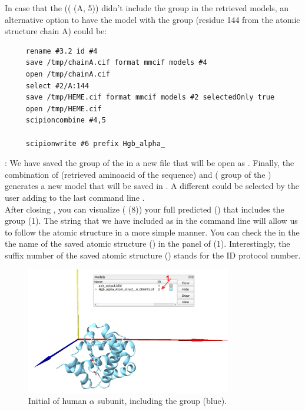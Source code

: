 In case that the   (( (A, 5)) didn't include the  group in the retrieved models, an alternative option to have the model with the  group (residue 144 from the atomic structure  chain A) could be:
\begin{verbatim}
     rename #3.2 id #4
     save /tmp/chainA.cif format mmcif models #4
     open /tmp/chainA.cif
     select #2/A:144
     save /tmp/HEME.cif format mmcif models #2 selectedOnly true 
     open /tmp/HEME.cif
     scipioncombine #4,5

     scipionwrite #6 prefix Hgb_alpha_
 \end{verbatim}
 : We have saved the  group of the   in a new file that will be open as  . Finally, the combination of   (retrieved aminoacid  of the  sequence) and  ( group of the  ) generates a new model  that will be saved in \scipion. A different  could be selected by the user adding to the last command line .\\


After closing \chimera, you can visualize ( (8)) your full predicted  () that includes the  group (1).  The string that we have included as  in the command line  will allow us to follow the atomic structure in a more simple manner. You can check the  in the the name of the saved atomic structure () in the  panel of  (1). Interestingly, the suffix number of the saved atomic structure () stands for the ID protocol number.
 
 \begin{figure}[H]
  \centering 
  \captionsetup{width=.9\linewidth} 
  \includegraphics[width=0.80\textwidth]{Images/Fig16}
  \caption{Initial  of human  $\alpha$ subunit, including the  group (blue).}
  \label{fig:chimera_model}
  \end{figure}
  
